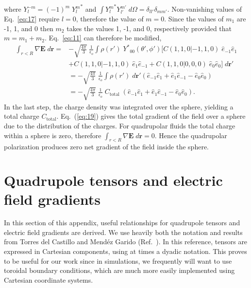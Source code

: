 where $Y_{l}^{-m} = (-1)^m\;{Y_{l}^{m}}^* $ and
$ \int {Y_{l}^{m}}^* Y_{l'}^{m'}\;d\Omega =
\delta_{ll'}\delta_{mm'} $.
Non-vanishing values of Eq.~\ref{eq:17} require $l = 0$,
therefore the value of $ m = 0 $. Since the values of $ m_1$ are -1,
1, and 0 then $m_2$ takes the values 1, -1, and 0, respectively
provided that $m = m_1 + m_2$.  Eq.~\ref{eq:11} can therefore be
modified,
\begin{equation}
\begin{split}
\int_{r<R} {\nabla}\mathbf{E}\;d\mathbf{r} = &- \sqrt{\frac{4\pi}{{3}}}\;\frac{1}{\epsilon_o}\int \rho(r')\;{Y^*}_{00}(\theta', \phi')[ C(1, 1, 0|-1,1,0)\;{\hat{e}_{-1}}{\hat{e}_{1}}\\  &+ C(1, 1, 0|-1,1,0)\;{\hat{e}_{1}}{\hat{e}_{-1}}+C(
1, 1, 0|0,0,0)\;{\hat{e}_{0}}{\hat{e}_{0}} ]\; d\mathbf{r}' \\
&= -\sqrt{\frac{4\pi}{{3}}}\;\frac{1}{\epsilon_o}\int \rho(r')\;d\mathbf{r}'\left({\hat{e}_{-1}}{\hat{e}_{1}}+{\hat{e}_{1}}{\hat{e}_{-1}}-{\hat{e}_{0}}{\hat{e}_{0}}\right)\\
&= - \sqrt{\frac{4\pi}{{3}}}\;\frac{1}{\epsilon_o}\;C_\mathrm{total}\;\left({\hat{e}_{-1}}{\hat{e}_{1}}+{\hat{e}_{1}}{\hat{e}_{-1}}-{\hat{e}_{0}}{\hat{e}_{0}}\right).
\end{split}
\label{eq:19} 
\end{equation}
In the last step, the charge density was integrated over the sphere,
yielding a total charge $C_\mathrm{total}$. Eq.~(\ref{eq:19})
gives the total gradient of the field over a sphere due to the
distribution of the charges.  For quadrupolar fluids the total charge
within a sphere is zero, therefore
$ \int_{r<R} {\nabla}\mathbf{E}\;d\mathbf{r} = 0 $.  Hence the quadrupolar
polarization produces zero net gradient of the field inside the
sphere.

\section{Quadrupole tensors and electric field gradients}

In this section of this appendix, useful relationships for quadrupole tensors and electric field gradients are derived.
We use heavily both the notation and results from Torres del Castillo and Mend\'{e}z Garido (Ref.~\cite{Torres-del-Castillo:2006uo}).  
In this reference, tensors are expressed in Cartesian components, using at times a dyadic notation.  
This proves to be useful for our work since in simulations, we frequently will want to use
toroidal boundary conditions, which are much more easily implemented using Cartesian coordinate
systems.  

